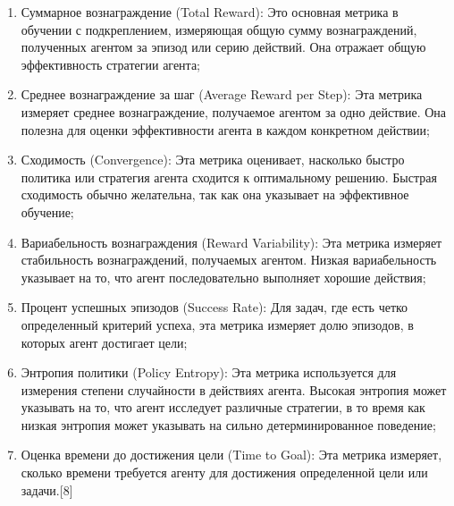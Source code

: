 \documentclass[bachelor, och, referat]{shiza}
\begin{document}
\begin{enumerate}
    \item Суммарное вознаграждение (Total Reward): Это основная метрика в обучении с подкреплением, измеряющая общую сумму вознаграждений, полученных агентом за эпизод или серию действий. Она отражает общую эффективность стратегии агента;
    \item Среднее вознаграждение за шаг (Average Reward per Step): Эта метрика измеряет среднее вознаграждение, получаемое агентом за одно действие. Она полезна для оценки эффективности агента в каждом конкретном действии;
    \item Сходимость (Convergence): Эта метрика оценивает, насколько быстро политика или стратегия агента сходится к оптимальному решению. Быстрая сходимость обычно желательна, так как она указывает на эффективное обучение;
    \item Вариабельность вознаграждения (Reward Variability): Эта метрика измеряет стабильность вознаграждений, получаемых агентом. Низкая вариабельность указывает на то, что агент последовательно выполняет хорошие действия;
    \item Процент успешных эпизодов (Success Rate): Для задач, где есть четко определенный критерий успеха, эта метрика измеряет долю эпизодов, в которых агент достигает цели;
    \item Энтропия политики (Policy Entropy): Эта метрика используется для измерения степени случайности в действиях агента. Высокая энтропия может указывать на то, что агент исследует различные стратегии, в то время как низкая энтропия может указывать на сильно детерминированное поведение;
    \item Оценка времени до достижения цели (Time to Goal): Эта метрика измеряет, сколько времени требуется агенту для достижения определенной цели или задачи.[8]
\end{enumerate}
\end{document}
